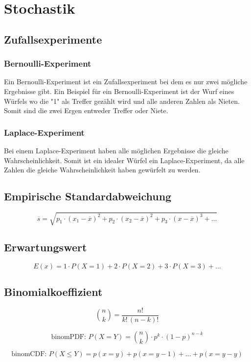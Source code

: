 \section{Stochastik}
	\subsection{Zufallsexperimente}
	\subsubsection{Bernoulli-Experiment}
	Ein Bernoulli-Experiment ist ein Zufallsexperiment bei dem es nur zwei mögliche Ergebnisse gibt. Ein Beispiel für ein Bernoulli-Experiment ist der Wurf eines Würfels wo die "1" als Treffer gezählt wird und alle anderen Zahlen als Nieten. Somit sind die zwei Ergen entweder Treffer oder Niete.
	\subsubsection{Laplace-Experiment}
	Bei einem Laplace-Experiment haben alle möglichen Ergebnisse die gleiche Wahrscheinlichkeit. Somit ist ein idealer Würfel ein Laplace-Experiment, da alle Zahlen die gleiche Wahrscheinlichkeit haben gewürfelt zu werden.
	\subsection{Empirische Standardabweichung}
		$$ \overline{s} = \sqrt{p_{1} \cdot (x_{1}-\overline{x})^{2}+p_{2} \cdot (x_{2}-\overline{x})^{2}+p_{3} \cdot (x-\overline{x})^{3}+...} $$
	\subsection{Erwartungswert}
		$$ E(x) = 1 \cdot P(X = 1) + 2 \cdot P(X = 2) + 3 \cdot P(X = 3) + ... $$
	\subsection{Binomialkoeffizient}
$$
\binom{n}{k} =  \frac{n!}{k!\,(n-k)!}
$$

$$
\text{binomPDF: } P(X=Y) = \binom{n}{k} \cdot p^{k} \cdot (1-p)^{n-k}
$$

$$
\text{binomCDF: } P(X\leq Y) = p(x=y) + p(x=y-1) + ... + p(x=y-y)
$$

